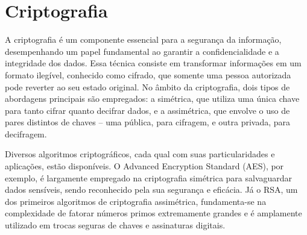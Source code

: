 \newcommand{\texCommand}[1]{\texttt{\textbackslash{#1}}}%

\newcommand{\exemplo}[1]{%
\vspace{\baselineskip}%
\noindent\fbox{\begin{minipage}{\textwidth}#1\end{minipage}}%
\\\vspace{\baselineskip}}%

\newcommand{\exemploVerbatim}[1]{%
\vspace{\baselineskip}%
\noindent\fbox{\begin{minipage}{\textwidth}%
#1\end{minipage}}%
\\\vspace{\baselineskip}}%


\section{Criptografia} %

A criptografia é um componente essencial para a segurança da informação, desempenhando um papel fundamental ao garantir a confidencialidade e a integridade dos dados. Essa técnica consiste em transformar informações em um formato ilegível, conhecido como cifrado, que somente uma pessoa autorizada pode reverter ao seu estado original. No âmbito da criptografia, dois tipos de abordagens principais são empregados: a simétrica, que utiliza uma única chave para tanto cifrar quanto decifrar dados, e a assimétrica, que envolve o uso de pares distintos de chaves – uma pública, para cifragem, e outra privada, para decifragem.

Diversos algoritmos criptográficos, cada qual com suas particularidades e aplicações, estão disponíveis. O Advanced Encryption Standard (AES), por exemplo, é largamente empregado na criptografia simétrica para salvaguardar dados sensíveis, sendo reconhecido pela sua segurança e eficácia. Já o RSA, um dos primeiros algoritmos de criptografia assimétrica, fundamenta-se na complexidade de fatorar números primos extremamente grandes e é amplamente utilizado em trocas seguras de chaves e assinaturas digitais.

